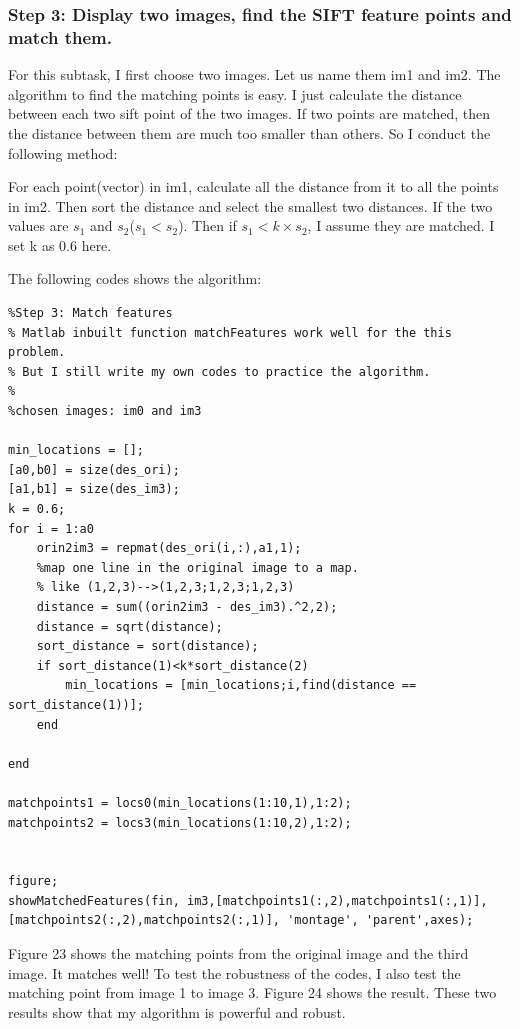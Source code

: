 \documentclass{article}
\begin{document}
\subsubsection*{Step 3: Display two images, find the SIFT feature points and match them.}

For this subtask, I first choose two images. Let us name them im1 and im2. The algorithm to find the matching points is easy. I just calculate the distance between each two sift point of the two images. If two points are matched, then the distance between them are much too smaller than others. So I conduct the following method:

For each point(vector) in im1, calculate all the distance from it to all the points in im2. Then sort the distance and select the smallest two distances. If the two values are $s_1$ and $s_2$($s_1 < s_2$). Then if $s_1 < k\times s_2$, I assume they are matched. I set k as 0.6 here.

The following codes shows the algorithm:

\begin{lstlisting}
%Step 3: Match features
% Matlab inbuilt function matchFeatures work well for the this problem.
% But I still write my own codes to practice the algorithm.
%
%chosen images: im0 and im3

min_locations = [];
[a0,b0] = size(des_ori);
[a1,b1] = size(des_im3);
k = 0.6;
for i = 1:a0
    orin2im3 = repmat(des_ori(i,:),a1,1);
    %map one line in the original image to a map.
    % like (1,2,3)-->(1,2,3;1,2,3;1,2,3)
    distance = sum((orin2im3 - des_im3).^2,2);
    distance = sqrt(distance);
    sort_distance = sort(distance);
    if sort_distance(1)<k*sort_distance(2)
        min_locations = [min_locations;i,find(distance == sort_distance(1))];
    end
    
end

matchpoints1 = locs0(min_locations(1:10,1),1:2);
matchpoints2 = locs3(min_locations(1:10,2),1:2);


figure;
showMatchedFeatures(fin, im3,[matchpoints1(:,2),matchpoints1(:,1)], [matchpoints2(:,2),matchpoints2(:,1)], 'montage', 'parent',axes);

\end{lstlisting}

Figure 23 shows the matching points from the original image and the third image. It matches well! To test the robustness of the codes, I also test the matching point from image 1 to image 3. Figure 24 shows the result. These two results show that my algorithm is powerful and robust.
\end{document}

